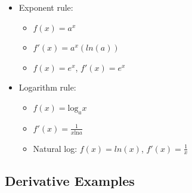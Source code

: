 \begin{itemize}
\begin{itemize}
    \end{itemize}
    \item Exponent rule:
    \begin{itemize}
        \item $f(x) = a^x$
        \item $f'(x) = a^x(ln(a))$
        \item $f(x) = e^x$, $f'(x) = e^x$
    \end{itemize}
    \item Logarithm rule:
    \begin{itemize}
        \item $f(x) = \text{log}_a x$
        \item $f'(x) = \frac{1}{x\text{ln}a}$
        \item Natural log: $f(x) = ln(x)$, $f'(x) = \frac{1}{x}$
    \end{itemize}
\end{itemize}

\subsection{Derivative Examples}

